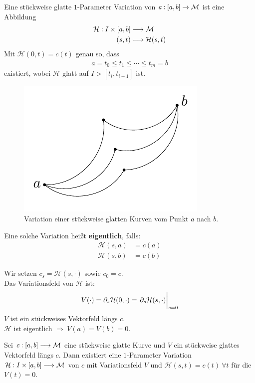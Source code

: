 \begin{defs}
Eine stückweise glatte $1$-Parameter Variation von $c:[a, b] \rightarrow \mathcal{M}$ ist eine Abbildung
\begin{align*}
\mathcal{H}: I \times [a, b] &\longrightarrow \mathcal{M} \\
(s, t) &\longmapsto \mathcal{H}(s, t)
\end{align*}
Mit $\mathcal{H}(0, t) = c(t)$ genau so, dass 
\begin{align*}
a= t_0 \leq t_1 \leq \cdots \leq t_m = b
\end{align*}
existiert, wobei $\mathcal{H}$ glatt auf $I > [t_i, t_{i+1}]$ ist.
\begin{figure}[H]
\centering
\includegraphics[width=0.45\linewidth]{figures/tikz/variationpiecewise.pdf}
\caption{Variation einer stückweise glatten Kurven vom Punkt $a$ nach $b$.}
\label{img:variationpiecewise}
\end{figure}
Eine solche Variation heißt \textbf{eigentlich}, falls:
\begin{align*}
\mathcal{H}(s, a) &= c(a) \\
\mathcal{H}(s, b) &= c(b) 
\end{align*}
\end{defs}
Wir setzen $c_s = \mathcal{H}(s, \cdot)$ sowie $c_0 = c$. \\
Das Variationsfeld von $\mathcal{H}$ ist:
\begin{align*}
V(\cdot) = \partial_s \mathcal{H}(0,\cdot) = \eval{\partial_s \mathcal{H}(s, \cdot)}_{s=0}
\end{align*}
$V$ ist ein stückweises Vektorfeld längs $c$. \\
$\mathcal{H}$ ist eigentlich $\Rightarrow \ V(a) = V(b) = 0$.
\begin{lem}
Sei $c:[a, b] \longrightarrow \mathcal{M}$ eine stückweise glatte Kurve und $V$ ein stückweise glattes Vektorfeld längs $c$. 
Dann existiert eine $1$-Parameter Variation $\mathcal{H}: I \times [a, b] \longrightarrow \mathcal{M}$ von $c$ mit Variationsfeld $V$ und $\mathcal{H}(s, t) = c(t) \ \forall t$ für die $V(t)=0$.
\end{lem}
